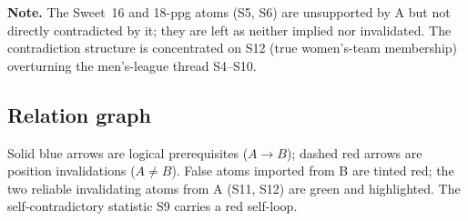 \documentclass[11pt]{article}
\begin{document}
\noindent
\textbf{Note.} The Sweet~16 and 18-ppg atoms (S5, S6) are unsupported by A but
not directly contradicted by it; they are left as neither implied nor
invalidated. The contradiction structure is concentrated on S12 (true
women's-team membership) overturning the men's-league thread S4--S10.

\subsection*{Relation graph}

Solid blue arrows are logical prerequisites ($A \rightarrow B$); dashed red
arrows are position invalidations ($A \neq B$). False atoms imported from B are
tinted red; the two reliable invalidating atoms from A (S11, S12) are green and
highlighted. The self-contradictory statistic S9 carries a red self-loop.
\end{document}
